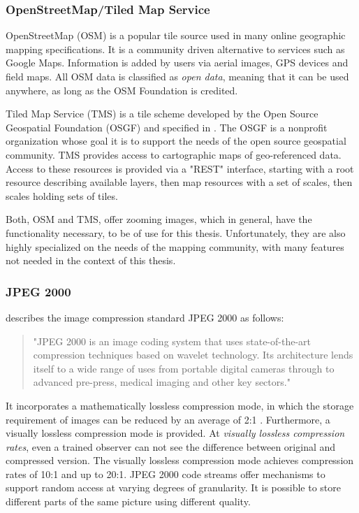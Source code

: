 \subsubsection{OpenStreetMap/Tiled Map Service}
OpenStreetMap (OSM) is a popular tile source used in many online geographic mapping specifications\cite{web:openseadragon}. It is a community driven alternative to services such as Google Maps. Information is added by users via aerial images, GPS devices and field maps. All OSM data is classified as \emph{open data}, meaning that it can be used anywhere, as long as the OSM Foundation is credited\cite{web:osm}.

Tiled Map Service (TMS) is a tile scheme developed by the Open Source Geospatial Foundation (OSGF)\cite{web:openseadragon} and specified in \cite{web:tms}. The OSGF is a nonprofit organization whose goal it is to support the needs of the open source geospatial community. TMS provides access to cartographic maps of geo-referenced data. Access to these resources is provided via a "REST" interface, starting with a root resource describing available layers, then map resources with a set of scales, then scales holding sets of tiles\cite{web:tms}.

Both, OSM and TMS, offer zooming images, which in general, have the functionality necessary, to be of use for this thesis. Unfortunately, they are also highly specialized on the needs of the mapping community, with many features not needed in the context of this thesis.


\subsubsection{JPEG 2000}
\cite{web:jpeg2000} describes the image compression standard JPEG 2000 as follows:
\begin{quotation}
	"JPEG 2000 is an image coding system that uses state-of-the-art compression techniques based on wavelet technology. Its architecture lends itself to a wide range of uses from portable digital cameras through to advanced pre-press, medical imaging and other key sectors."
\end{quotation}

It incorporates a mathematically lossless compression mode, in which the storage requirement of images can be reduced by an average of 2:1 \cite{Taubmann01}. Furthermore, a visually lossless compression mode is provided. At \emph{visually lossless compression rates}, even a trained observer can not see the difference between original and compressed version. The visually lossless compression mode achieves compression rates of 10:1 and up to 20:1\cite{intoPix08}. JPEG 2000 code streams offer mechanisms to support random access at varying degrees of granularity. It is possible to store different parts of the same picture using different quality\cite{Taubmann01}. 

